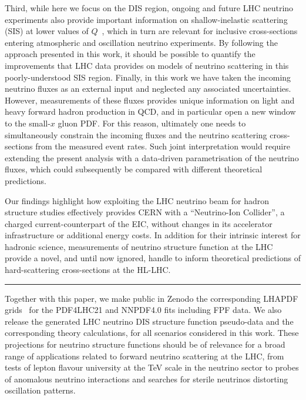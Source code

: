 Third, while here we focus on the DIS
region, ongoing and future LHC neutrino experiments also provide
important information on shallow-inelastic scattering (SIS)
 at lower values of $Q$~\cite{Jeong:2023hwe,Candido:2023utz},
 which in turn are relevant for inclusive cross-sections
entering atmospheric and oscillation neutrino experiments.
%
By following the approach presented in this work, it should be possible to quantify
the improvements that LHC data provides on models
of neutrino scattering in this poorly-understood SIS region.
%
Finally, in this work we have taken the incoming neutrino fluxes
as an external input and neglected any associated uncertainties.
%
However, measurements of these fluxes provides
unique information on light and heavy forward hadron
production in QCD, and in particular open
a new window to the small-$x$ gluon PDF.
%
For this reason, ultimately one needs to simultaneously constrain 
the incoming fluxes and the neutrino scattering cross-sections
from the measured event rates.
%
Such joint interpretation would require extending the present
analysis with a data-driven parametrisation of the neutrino fluxes,
which could subsequently be compared with different theoretical predictions.

Our findings highlight how exploiting the LHC neutrino beam for hadron structure
studies effectively provides CERN with a ``Neutrino-Ion Collider'', a charged
current-counterpart of the EIC, without  changes in
its accelerator infrastructure or additional energy costs.
%
In addition for their intrinsic interest for hadronic science,
measurements of neutrino structure function at the LHC
provide a novel, and until now ignored, handle to inform theoretical
predictions of hard-scattering cross-sections  at the HL-LHC.

\begin{center}
\rule{5cm}{.1pt}
\end{center}
\bigskip

Together with this paper, we 
make public in Zenodo
the corresponding {\sc\small LHAPDF} grids~\cite{Buckley:2014ana}
for the PDF4LHC21 and NNPDF4.0 fits including FPF data.
%
We also release
the generated LHC neutrino DIS structure function pseudo-data
and the corresponding theory
calculations, for all scenarios considered in this work.
%
These projections for neutrino structure functions
should be of relevance for a broad range of
applications related to forward
neutrino scattering at the LHC, from tests
of lepton flavour university at the TeV scale
in the neutrino sector to probes of anomalous neutrino
interactions and searches for sterile neutrinos
distorting  oscillation patterns.

